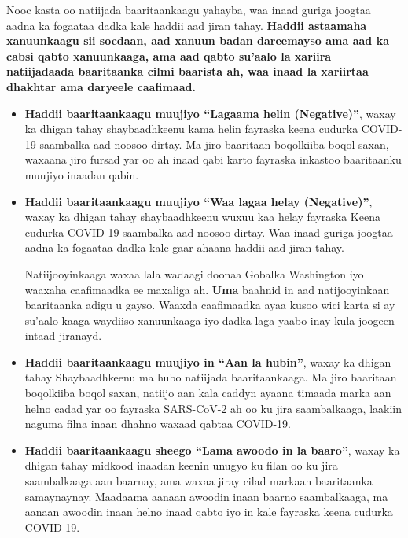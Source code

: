 \documentclass[10pt]{article}
\begin{document}
Nooc kasta oo natiijada baaritaankaagu yahayba, waa inaad guriga joogtaa aadna
ka fogaataa dadka kale haddii aad jiran tahay. \textbf{Haddii astaamaha
xanuunkaagu sii socdaan, aad xanuun badan dareemayso ama aad ka cabsi qabto
xanuunkaaga, ama aad qabto su'aalo la xariira natiijadaada baaritaanka cilmi
baarista ah, waa inaad la xariirtaa dhakhtar ama daryeele caafimaad.}

\begin{itemize}


\item

  \textbf{Haddii baaritaankaagu muujiyo ``Lagaama helin (Negative)''}, waxay ka
  dhigan tahay shaybaadhkeenu kama helin fayraska keena cudurka COVID-19
  saambalka aad noosoo dirtay. Ma jiro baaritaan boqolkiiba boqol saxan, waxaana
  jiro fursad yar oo ah inaad qabi karto fayraska inkastoo baaritaanku muujiyo
  inaadan qabin.

\item

  \textbf{Haddii baaritaankaagu muujiyo ``Waa lagaa helay (Negative)''}, waxay
  ka dhigan tahay shaybaadhkeenu wuxuu kaa helay fayraska Keena cudurka COVID-19
  saambalka aad noosoo dirtay. Waa inaad guriga joogtaa aadna ka fogaataa dadka
  kale gaar ahaana haddii aad jiran tahay.

  Natiijooyinkaaga waxaa lala wadaagi doonaa Gobalka Washington iyo waaxaha
  caafimaadka ee maxaliga ah. \textbf{Uma} baahnid in aad natijooyinkaan
  baaritaanka adigu u gayso. Waaxda caafimaadka ayaa kusoo wici karta si ay
  su'aalo kaaga waydiiso xanuunkaaga iyo dadka laga yaabo inay kula joogeen
  intaad jiranayd.

\item

  \textbf{Haddii baaritaankaagu muujiyo in ``Aan la hubin''}, waxay ka dhigan
  tahay Shaybaadhkeenu ma hubo natiijada baaritaankaaga. Ma jiro baaritaan
  boqolkiiba boqol saxan, natiijo aan kala caddyn ayaana timaada marka aan helno
  cadad yar oo fayraska SARS-CoV-2 ah oo ku jira saambalkaaga, laakiin naguma
  filna inaan dhahno waxaad qabtaa COVID-19.

\item

  \textbf{Haddii baaritaankaagu sheego ``Lama awoodo in la baaro''}, waxay ka
  dhigan tahay midkood inaadan keenin unugyo ku filan oo ku jira saambalkaaga
  aan baarnay, ama waxaa jiray cilad markaan baaritaanka samaynaynay. Maadaama
  aanaan awoodin inaan baarno saambalkaaga, ma aanaan awoodin inaan helno inaad
  qabto iyo in kale fayraska keena cudurka COVID-19.

\end{itemize}
\end{document}
